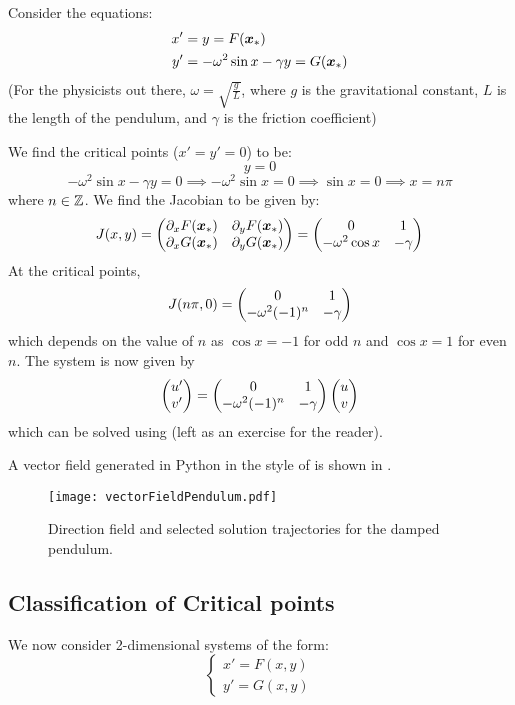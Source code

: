 \begin{eg}\label{eg:dampedpendulum} Consider the equations:
	\begin{align*}
		x' &= y = F(\bm{x}_{\ast})\\
		y' &= -\omega^2 \sin{x} - \gamma y = G(\bm{x}_{\ast})
	\end{align*}
	(For the physicists out there, $\omega = \sqrt{\frac{g}{L}}$, where $g$ is the gravitational constant, $L$ is the length of the pendulum, and $\gamma$ is the friction coefficient)
	
	We find the critical points ($x'=y'=0$) to be:
	\[
	y=0 
	\]
	\[
	-\omega^2 \sin{x} - \gamma y = 0 \implies -\omega^2 \sin{x} = 0 \implies\sin{x} = 0 \implies x = n\pi
	\]
	where $n \in \mathbb{Z}$. We find the Jacobian to be given by:
	\[
	J(x,y) = \begin{pmatrix}
		\partial_x F(\bm{x}_{\ast}) & \partial_y F(\bm{x}_{\ast}) \\ \partial_x G(\bm{x}_{\ast}) & \partial_y G(\bm{x}_{\ast})\end{pmatrix} = \begin{pmatrix} 0 & 1 \\ 
		-\omega^2 \cos{x} & -\gamma\end{pmatrix}
	\]
	At the critical points, 
	\[
	J(n\pi,0) = \begin{pmatrix} 0 & 1 \\ -\omega^2(-1)^n & -\gamma\end{pmatrix}
	\]
	which depends on the value of $n$ as $\cos{x} = -1$ for odd $n$ and $\cos{x} = 1$ for even $n$. The system is now given by 
	\[
	\begin{pmatrix}u'\\v'\end{pmatrix} = \begin{pmatrix}0 & 1 \\ -\omega^2(-1)^n & -\gamma\end{pmatrix} \begin{pmatrix}u\\v\end{pmatrix}
	\]
	which can be solved using  (left as an exercise for the reader).
	
	A vector field generated in Python in the style of  is shown in .
\end{eg}

\begin{figure}[H]
	\centering
	\texttt{[image: vectorFieldPendulum.pdf]}
	\caption{Direction field and selected solution trajectories for the damped pendulum.}
	\label{fig:pendulumpython}
\end{figure}

\subsection{Classification of Critical points}

We now consider 2-dimensional systems of the form: 
\[
\begin{cases}
	x' = F(x,y) \\
	y' = G(x,y) 
\end{cases}
\]

